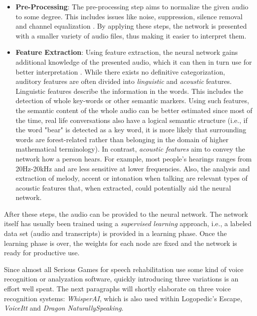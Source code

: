 \documentclass[draft,final]{vutinfth} %
\begin{document}
\begin{itemize}
\item \textbf{Pre-Processing}: The pre-processing step aims to normalize the given audio to some degree. This includes issues like noise, suppression, silence removal and channel equalization \cite{9133298}. By applying these steps, the network is presented with a smaller variety of audio files, thus making it easier to interpret them.
\item \textbf{Feature Extraction}: Using feature extraction, the neural network gains additional knowledge of the presented audio, which it can then in turn use for better interpretation \cite{9133298}. While there exists no definitive categorization, auditory features are often divided into \emph{linguistic} and \emph{acoustic} features. Linguistic features describe the information in the words. This includes the detection of whole key-words or other semantic markers. Using such features, the semantic content of the whole audio can be better estimated since most of the time, real life conversations also have a logical semantic structure (i.e., if the word "bear" is detected as a key word, it is more likely that surrounding words are forest-related rather than belonging in the domain of higher mathematical terminology).
In contrast, \emph{acoustic features} aim to convey the network how a person hears. For example, most people's hearings ranges from 20Hz-20kHz and are less sensitive at lower frequencies. Also, the analysis and extraction of melody, accent or intonation when talking are relevant types of acoustic features  that, when extracted, could potentially aid the neural network.
\end{itemize}

After these steps, the audio can be provided to the neural network. The network itself has usually been trained using a \emph{supervised learning} approach, i.e., a labeled data set (audio and transcripts) is provided in a learning phase. Once the learning phase is over, the weights for each node are fixed and the network is ready for productive use.

Since almost all Serious Games for speech rehabilitation use some kind of voice recognition or analyzation software, quickly introducing three variations is an effort well spent. The next paragraphs will shortly elaborate on three voice recognition systems: \emph{WhisperAI}, which is also used within Logopedic's Escape, \emph{VoiceItt} and \emph{Dragon NaturallySpeaking}.
\end{document}
